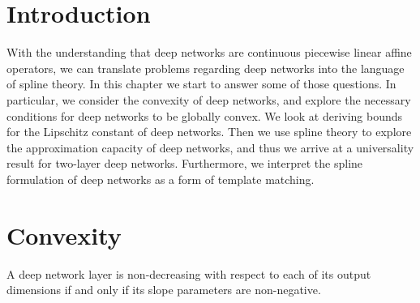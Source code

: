 \section{Introduction}

With the understanding that deep networks are continuous piecewise linear affine operators, we can translate problems regarding deep networks into the language of spline theory. In this chapter we start to answer some of those questions. In particular, we consider the convexity of deep networks, and explore the necessary conditions for deep networks to be globally convex. We look at deriving bounds for the Lipschitz constant of deep networks. Then we use spline theory to explore the approximation capacity of deep networks, and thus we arrive at a universality result for two-layer deep networks. Furthermore, we interpret the spline formulation of deep networks as a form of template matching.

\section{Convexity}\label{sec:convexity}

\begin{proposition}\label{prop:non_decreasing_property}
    A deep network layer is non-decreasing with respect to each of its output dimensions if and only if its slope parameters are non-negative.
\end{proposition}

